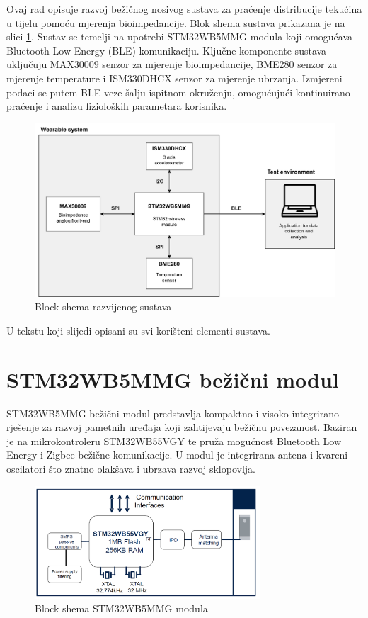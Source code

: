 \documentclass[../diplomski_rad.tex]{subfiles}
\begin{document}
\sloppy

\justifying

Ovaj rad opisuje razvoj bežičnog nosivog sustava za praćenje distribucije tekućina u tijelu pomoću mjerenja bioimpedancije. 
Blok shema sustava prikazana je na slici \ref{slk:blok_shema}.
Sustav se temelji na upotrebi STM32WB5MMG modula koji omogućava Bluetooth Low Energy (BLE) komunikaciju. 
Ključne komponente sustava uključuju MAX30009 senzor za mjerenje bioimpedancije, 
BME280 senzor za mjerenje temperature i ISM330DHCX senzor za mjerenje ubrzanja. 
Izmjereni podaci se putem BLE veze šalju ispitnom okruženju, omogućujući kontinuirano praćenje i analizu 
fizioloških parametara korisnika. 

\begin{figure}[htb]
    \centering
    \includegraphics[width=1\textwidth]{Figures/shema_sustava.png} 
    \caption{Block shema razvijenog sustava}
    \label{slk:blok_shema}
\end{figure}

U tekstu koji slijedi opisani su svi korišteni elementi sustava.

\section{STM32WB5MMG bežični modul}

STM32WB5MMG bežični modul predstavlja kompaktno i visoko integrirano rješenje za razvoj pametnih uređaja koji zahtijevaju bežičnu povezanost. 
Baziran je na mikrokontroleru STM32WB55VGY te pruža mogućnost Bluetooth Low Energy i Zigbee bežične komunikacije. 
U modul je integrirana antena i kvarcni oscilatori što znatno olakšava i ubrzava razvoj sklopovlja.  

\begin{figure}[htb]
    \centering
    \includegraphics[width=0.75\textwidth]{Figures/stm32module.png} 
    \caption{Block shema STM32WB5MMG modula \cite{stm32module}}
    \label{slk:stm32module}
\end{figure}
\end{document}
